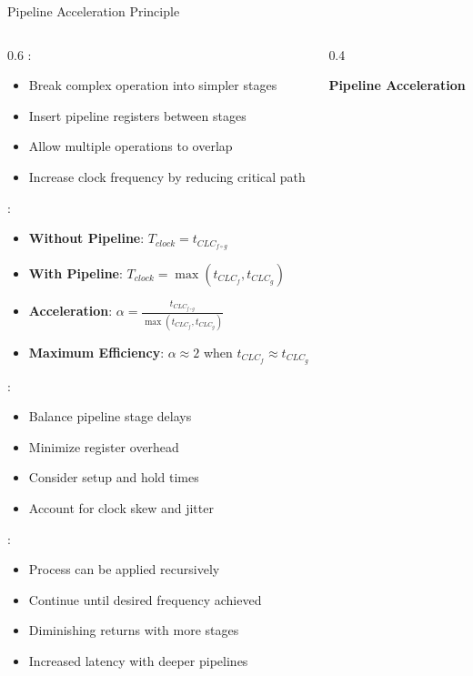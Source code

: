 \begin{frame}{Pipeline Acceleration Principle}
\begin{columns}
\begin{column}{0.6\textwidth}
:
\begin{itemize}
\item Break complex operation into simpler stages
\item Insert pipeline registers between stages
\item Allow multiple operations to overlap
\item Increase clock frequency by reducing critical path
\end{itemize}

\vspace{0.3cm}
:
\begin{itemize}
\item \textbf{Without Pipeline}: $T_{clock} = t_{CLC_{f \circ g}}$
\item \textbf{With Pipeline}: $T_{clock} = \max(t_{CLC_f}, t_{CLC_g})$
\item \textbf{Acceleration}: $\alpha = \frac{t_{CLC_{f \circ g}}}{\max(t_{CLC_f}, t_{CLC_g})}$
\item \textbf{Maximum Efficiency}: $\alpha \approx 2$ when $t_{CLC_f} \approx t_{CLC_g}$
\end{itemize}

\vspace{0.3cm}
:
\begin{itemize}
\item Balance pipeline stage delays
\item Minimize register overhead
\item Consider setup and hold times
\item Account for clock skew and jitter
\end{itemize}

\vspace{0.3cm}
:
\begin{itemize}
\item Process can be applied recursively
\item Continue until desired frequency achieved
\item Diminishing returns with more stages
\item Increased latency with deeper pipelines
\end{itemize}
\end{column}
\begin{column}{0.4\textwidth}
\begin{center}
\textbf{Pipeline Acceleration}
\vspace{0.3cm}


\end{center}
\end{column}
\end{columns}
\end{frame}
